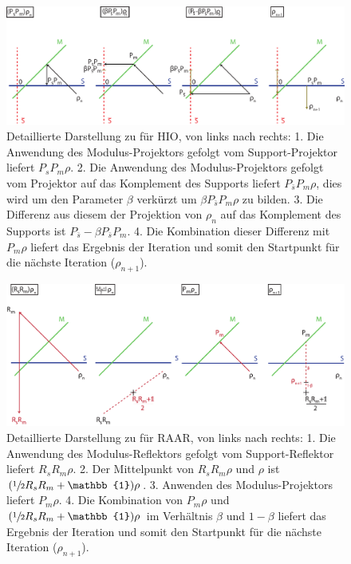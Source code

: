 \begin{figure}
	\centering
	\includegraphics[width=1\textwidth]{images/hio.pdf}
	\caption[HIO]{Detaillierte Darstellung zu  für HIO, von links nach rechts: 1. Die Anwendung des Modulus-Projektors gefolgt vom Support-Projektor liefert $P_sP_m\rho$. 2. Die Anwendung des Modulus-Projektors gefolgt vom Projektor auf das Komplement des Supports liefert  $P_{\bar{s}}P_m\rho$, dies wird um den Parameter $\beta$ verkürzt um $\beta P_{\bar{s}}P_m\rho$ zu bilden. 3. Die Differenz aus diesem der Projektion von $\rho_n$ auf das Komplement des Supports ist $P_{\bar{s}}-\beta P_{\bar{s}}P_m$. 4. Die Kombination dieser Differenz mit $P_m\rho$ liefert das Ergebnis der Iteration und somit den Startpunkt für die nächste Iteration ($\rho_{n+1}$).}
	\label{fig:raar}
\end{figure} 	

\begin{figure}
	\centering
	\includegraphics[width=1\textwidth]{images/raar.pdf}
	\caption[RAAR]{Detaillierte Darstellung zu  für RAAR, von links nach rechts: 1. Die Anwendung des Modulus-Reflektors gefolgt vom Support-Reflektor liefert $R_sR_m\rho$. 2. Der Mittelpunkt von $R_sR_m\rho$ und $\rho$ ist $(\sfrac{1}{2}R_sR_m+\mathbb{1})\rho$. 3. Anwenden des Modulus-Projektors liefert $P_m\rho$. 4. Die Kombination von $P_m\rho$ und $(\sfrac{1}{2}R_sR_m+\mathbb{1})\rho$ im Verhältnis $\beta$ und $1-\beta$ liefert das Ergebnis der Iteration  und somit den Startpunkt für die nächste Iteration ($\rho_{n+1}$).}
	\label{fig:raar}
\end{figure} 	
